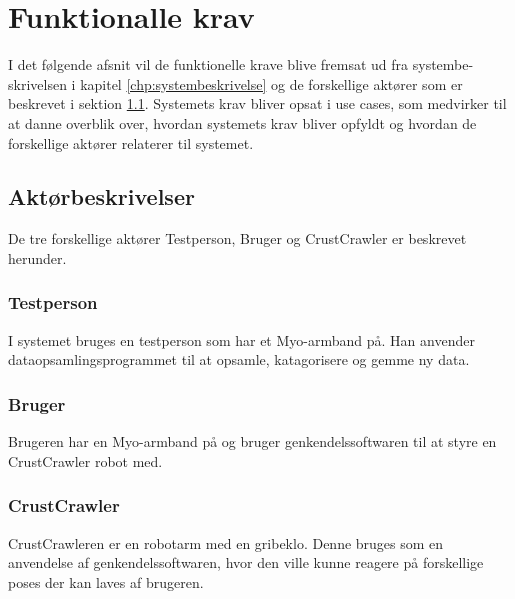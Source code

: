 \thispagestyle{fancy}
\section{Funktionalle krav}
\label{sec:funktionellekrav}
I det følgende afsnit vil de funktionelle krave blive fremsat ud fra systembe- skrivelsen i kapitel \ref{chp:systembeskrivelse} og de forskellige aktører som er beskrevet i sektion \ref{sec:aktorbeskrivelser}.
Systemets krav bliver opsat i use cases, som medvirker til at danne overblik over, hvordan systemets krav bliver opfyldt og hvordan de forskellige aktører relaterer til systemet.

\subsection{Aktørbeskrivelser}
\label{sec:aktorbeskrivelser}
De tre forskellige aktører Testperson, Bruger og CrustCrawler er beskrevet herunder.

\subsubsection{Testperson}
I systemet bruges en testperson som har et Myo-armband på. Han anvender dataopsamlingsprogrammet til at opsamle, katagorisere og gemme ny data.

\subsubsection{Bruger}
Brugeren har en Myo-armband på og bruger genkendelssoftwaren til at styre en CrustCrawler robot med.

\subsubsection{CrustCrawler}
CrustCrawleren er en robotarm med en gribeklo. Denne bruges som en anvendelse af genkendelssoftwaren, hvor den ville kunne reagere på forskellige poses der kan laves af brugeren.

